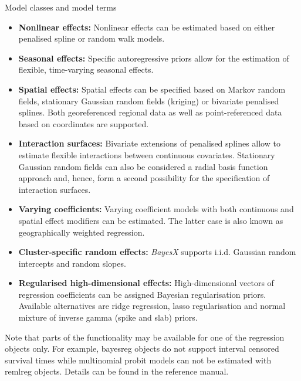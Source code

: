 \begin{stanza}{Model classes and model terms}
\begin{itemize}
\item{\bf\sffamily Nonlinear effects:} Nonlinear effects can be estimated based on either penalised spline or random walk
    models.

\item{\bf\sffamily Seasonal effects:} Specific autoregressive priors allow for the estimation of flexible, time-varying
    seasonal effects.

\item{\bf\sffamily Spatial effects:} Spatial effects can be specified based on Markov random fields, stationary Gaussian
    random fields (kriging) or bivariate penalised splines. Both georeferenced regional data as well as point-referenced
    data based on coordinates are supported.

\item{\bf\sffamily Interaction surfaces:} Bivariate extensions of penalised splines allow to estimate flexible interactions
    between continuous covariates. Stationary Gaussian random fields can also be considered a radial basis function
    approach and, hence, form a second possibility for the specification of interaction surfaces.

\item{\bf\sffamily Varying coefficients:} Varying coefficient models with both continuous and spatial effect modifiers can
    be estimated. The latter case is also known as geographically weighted regression.

\item{\bf\sffamily Cluster-specific random effects:} {\em BayesX} supports i.i.d. Gaussian random intercepts and random
    slopes.

\item {\bf\sffamily Regularised high-dimensional effects:} High-dimensional vectors of regression coefficients can be
    assigned Bayesian regularisation priors. Available alternatives are ridge regression, lasso regularisation and normal
    mixture of inverse gamma (spike and slab) priors.
\end{itemize}

Note that parts of the functionality may be available for one of the regression objects only. For example, bayesreg objects do
not support interval censored survival times while multinomial probit models can not be estimated with remlreg objects. Details
can be found in the reference manual.
\end{stanza}

